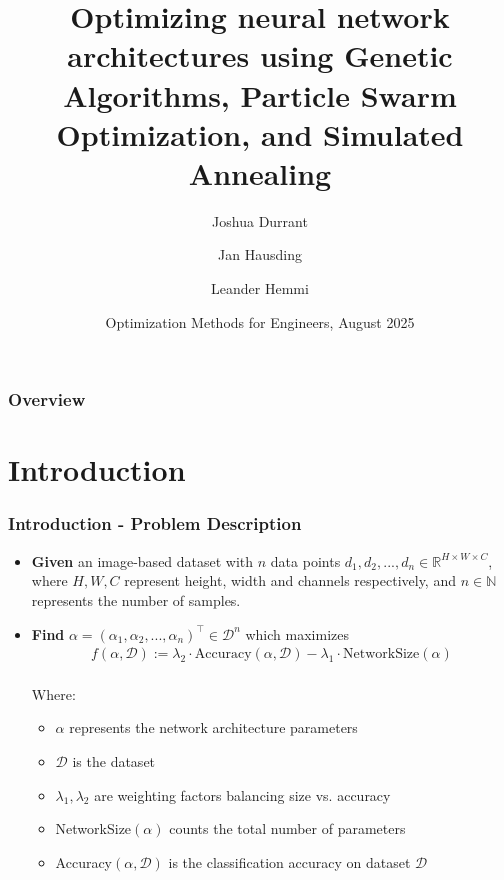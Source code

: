 \documentclass{beamer}
\title[Optimizing NNA with GAs, PSOs and SA]{Optimizing neural network architectures using Genetic Algorithms, Particle Swarm Optimization, and Simulated Annealing}
\author[Durrant, Hausding, Hemmi]
{Joshua Durrant \and Jan Hausding \and Leander Hemmi}
\institute[ETH Zurich]
{
    Department of Computer Science (D-INFK)\\
    ETH Zurich
}
\date[OMfE SS25]
{Optimization Methods for Engineers, August 2025}
\begin{document}
    \frame{\titlepage}

    \begin{frame}
        \frametitle{Overview}
        \tableofcontents
    \end{frame}

    \section{Introduction}

    \begin{frame}
        \frametitle{Introduction - Problem Description}
        \begin{itemize}
            \item \textbf{Given} an image-based dataset with $n$ data points $d_1, d_2, ..., d_n \in \mathbb{R}^{H \times W \times C}$, where $H, W, C$ represent height, width and channels respectively, and $n \in \mathbb{N}$ represents the number of samples.
               \item \textbf{Find} $\alpha = {(\alpha_1, \alpha_2, ..., \alpha_n)}^\top \in \mathcal{D}^n$ which maximizes
                \begin{align*}
                    f\left(\alpha, \mathcal{D}\right) := \lambda_2 \cdot \text{Accuracy}(\alpha, \mathcal{D}) - \lambda_1 \cdot \text{NetworkSize}(\alpha)
                \end{align*} \\
                Where: \\ 
                \begin{itemize}
                    \item $\alpha$ represents the network architecture parameters
                    \item $\mathcal{D}$ is the dataset
                    \item $\lambda_1, \lambda_2$ are weighting factors balancing size vs. accuracy
                    \item NetworkSize$(\alpha)$ counts the total number of parameters
                    \item Accuracy$(\alpha, \mathcal{D})$ is the classification accuracy on dataset $\mathcal{D}$
                \end{itemize}   
        \end{itemize}
    \end{frame}
\end{document}
